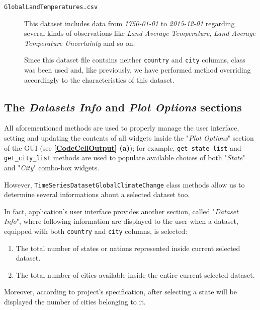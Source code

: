 \documentclass[sigconf]{acmart}
\begin{document}
\begin{description}
\item[\texttt{GlobalLandTemperatures.csv}] This dataset includes data from \textit{1750-01-01} to \textit{2015-12-01} regarding several kinds of observations like \textit{Land Average Temperature}, \textit{Land Average Temperature Uncertainty} and so on.

Since this dataset file contains neither \texttt{country} and \texttt{city} columns,  class was been used and, like previously, we have performed method overriding accordingly to the characteristics of this dataset.

\end{description}

\subsection{The \textit{Datasets Info} and \textit{Plot Options} sections}

All aforementioned methods are used to properly manage the user interface, setting and updating the contents of all widgets inside the "\textit{Plot Options}" section of the GUI (see \textbf{\cref{CodeCellOutput} (a)}); for example, \texttt{get\_state\_list} and \texttt{get\_city\_list} methods are used to populate available choices of both "\textit{State}" and "\textit{City}" combo-box widgets.

However, \texttt{TimeSeriesDatasetGlobalClimateChange} class methods allow us to determine several informations about a selected dataset too. 

In fact, application's user interface provides another section, called "\textit{Dataset Info}", where following information are displayed to the user when a dataset, equipped with both \texttt{country} and \texttt{city} columns, is selected:

\begin{enumerate}
\item The total number of states or nations represented inside current selected dataset.
\item The total number of cities available inside the entire current selected dataset.
\end{enumerate}

Moreover, according to project's specification, after selecting a state will be displayed the number of cities belonging to it.
\end{document}
